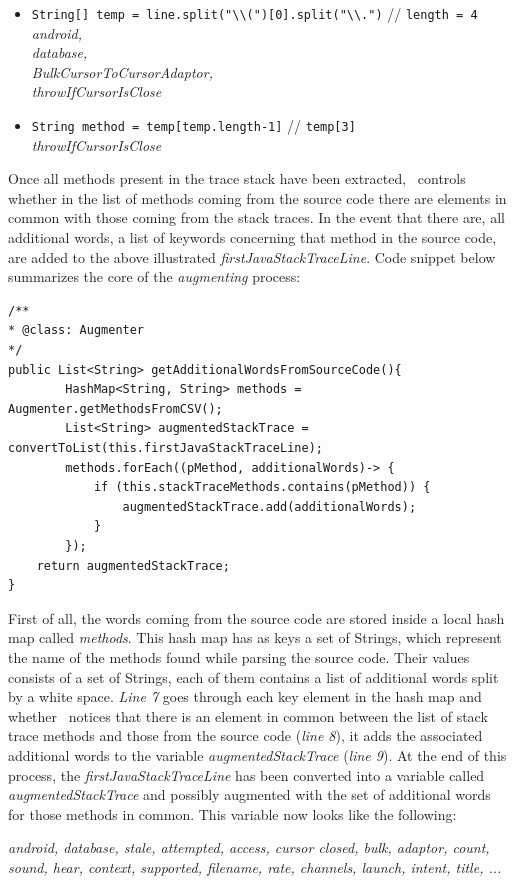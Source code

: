 \begin{enumerate}
\begin{itemize}
\item \texttt{String[] temp = line.split({\color{blue}"\textbackslash\textbackslash("})[0].split({\color{blue}"\textbackslash\textbackslash."})} 
{\color{brown}// {\small \texttt{length = 4} }}\\
\emph{android, \\database, \\BulkCursorToCursorAdaptor, \\throwIfCursorIsClose}

\item \texttt{String method = temp[temp.{\color{blue}length}-1]}
{\color{brown}// {\small \texttt{temp[3]} }}\\
\emph{throwIfCursorIsClose}

\end{itemize}
Once all methods present in the trace stack have been extracted, \toolname\ controls whether in the list of methods coming from the source code there are elements in common with those coming from the stack traces. 
In the event that there are, all additional words, \ie a list of keywords concerning that method in the source code, are added to the above illustrated \textit{firstJavaStackTraceLine}. 
Code snippet below summarizes the core of the \textit{augmenting} process: 
\begin{lstlisting}[caption=Augmenting a stack trace with methods coming from the source code,label={lst: sourcecode}]
/**
* @class: Augmenter
*/
public List<String> getAdditionalWordsFromSourceCode(){
		HashMap<String, String> methods = Augmenter.getMethodsFromCSV();
		List<String> augmentedStackTrace = convertToList(this.firstJavaStackTraceLine);
		methods.forEach((pMethod, additionalWords)-> {
			if (this.stackTraceMethods.contains(pMethod)) {
				augmentedStackTrace.add(additionalWords);
			}
		});
    return augmentedStackTrace;
}
\end{lstlisting}
First of all, the words coming from the source code are stored inside a local hash map called \textit{methods}.
This hash map has as keys a set of Strings, which represent the name of the methods found while parsing the source code. 
Their values consists of a set of Strings, each of them contains a list of additional words split by a white space.  
\textit{Line 7} goes through each key element in the hash map and whether \toolname\ notices that there is an element in common between the list of stack trace methods and those from the source code (\textit{line 8}), it adds the associated additional words to the variable \textit{augmentedStackTrace} (\textit{line 9}).
At the end of this process, the \textit{firstJavaStackTraceLine} has been converted into a variable called \textit{augmentedStackTrace} and possibly augmented with the set of additional words for those methods in common. This variable now looks like the following: 
\begin{center}
\smallbreak
\emph{\small android, database, stale, attempted, access, cursor closed, bulk, adaptor, count, \\{\color{red}sound, hear, context, supported, filename, rate, channels, launch, intent, title}, ... }
\end{center} 
\end{enumerate}
